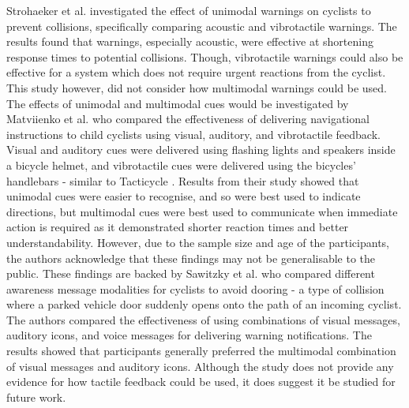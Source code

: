 \documentclass{mpaper}
\begin{document}
Strohaeker et al. \cite{STROHAEKER2022151} investigated the effect of unimodal warnings on cyclists to prevent collisions, specifically comparing acoustic and vibrotactile warnings. The results found that warnings, especially acoustic, were effective at shortening response times to potential collisions. Though, vibrotactile warnings could also be effective for a system which does not require urgent reactions from the cyclist. This study however, did not consider how multimodal warnings could be used. The effects of unimodal and multimodal cues would be investigated by Matviienko et al. \cite{10.1145/3290605.3300850, 10.1145/3229434.3229479} who compared the effectiveness of delivering navigational instructions to child cyclists using visual, auditory, and vibrotactile feedback. Visual and auditory cues were delivered using flashing lights and speakers inside a bicycle helmet, and vibrotactile cues were delivered using the bicycles' handlebars - similar to Tacticycle \cite{10.1145/2371574.2371631}. Results from their study showed that unimodal cues were easier to recognise, and so were best used to indicate directions, but multimodal cues were best used to communicate when immediate action is required as it demonstrated shorter reaction times and better understandability. However, due to the sample size and age of the participants, the authors acknowledge that these findings may not be generalisable to the public. These findings are backed by Sawitzky et al. \cite{10.1145/3490099.3511127, mti6010003} who compared different awareness message modalities for cyclists to avoid dooring - a type of collision where a parked vehicle door suddenly opens onto the path of an incoming cyclist. The authors compared the effectiveness of using combinations of visual messages, auditory icons, and voice messages for delivering warning notifications. The results showed that participants generally preferred the multimodal combination of visual messages and auditory icons. Although the study does not provide any evidence for how tactile feedback could be used, it does suggest it be studied for future work.
\end{document}
